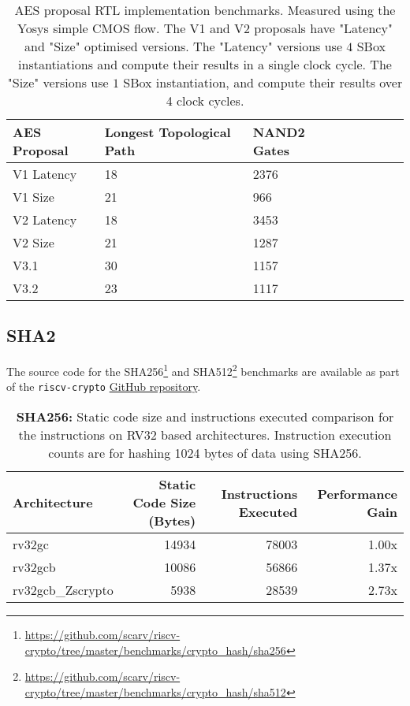 \begin{table}[h]
\centering
\begin{tabular}{llllllll}
AES Proposal & Longest Topological Path & NAND2 Gates \\ \hline
V1 Latency   & 18                       & 2376        \\
V1 Size      & 21                       & 966         \\
V2 Latency   & 18                       & 3453        \\
V2 Size      & 21                       & 1287        \\
V3.1         & 30                       & 1157        \\
V3.2         & 23                       & 1117        \\
\end{tabular}
\caption{
AES proposal RTL implementation benchmarks.
Measured using the Yosys simple CMOS flow.
The V1 and V2 proposals have "Latency" and "Size" optimised versions.
The "Latency" versions use $4$ SBox instantiations and compute their
results in a single clock cycle.
The "Size" versions use $1$ SBox instantiation, and compute their
results over 4 clock cycles.
}
\label{tab:benchmarks:aes:impl}
\end{table}

\newpage
\subsection{SHA2}
\label{sec:benchmark:sha2}

The source code for the
SHA256\footnote{\url{https://github.com/scarv/riscv-crypto/tree/master/benchmarks/crypto_hash/sha256}}
and
SHA512\footnote{\url{https://github.com/scarv/riscv-crypto/tree/master/benchmarks/crypto_hash/sha512}}
benchmarks are available as part of the {\tt riscv-crypto}
\href{https://github.com/scarv/riscv-crypto/tree/master/benchmarks/crypto_block/aes}{GitHub repository}.

\begin{table}[h]
\centering
\begin{tabular}{lrrr}
Architecture      & Static Code Size (Bytes) & Instructions Executed & Performance Gain \\ \hline
rv32gc            & 14934                    & 78003 & 1.00x          \\
rv32gcb           & 10086                    & 56866 & 1.37x          \\
rv32gcb\_Zscrypto & 5938                     & 28539 & 2.73x 
\end{tabular}
\caption{{\bf SHA256:}
Static code size and instructions executed comparison for
the  instructions on RV32 based architectures.
Instruction execution counts are for hashing 1024 bytes of data using
SHA256.
}
\label{tab:benchmarks:sha256}
\end{table}

